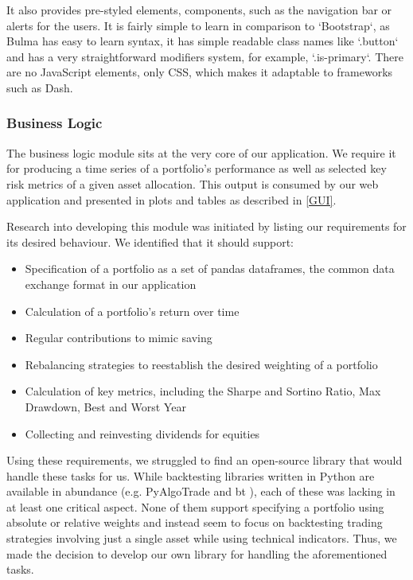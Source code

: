 \documentclass[main.tex]{subfiles}
\begin{document}
It also provides pre-styled elements, components, such as the navigation bar or alerts for the users. It is fairly simple to learn in comparison to `Bootstrap`, as Bulma has easy to learn syntax, it has simple readable class names like `.button` and has a very straightforward modifiers system, for example,  `.is-primary`. There are no JavaScript elements, only CSS, which makes it adaptable to frameworks such as Dash.


\subsubsection{Business Logic}
\label{BL}

The business logic module sits at the very core of our application. We require it for producing a time series of a portfolio's performance as well as selected key risk metrics of a given asset allocation. This output is consumed by our web application and presented in plots and tables as described in \ref{GUI}.

Research into developing this module was initiated by listing our requirements for its desired behaviour. We identified that it should support:

\begin{itemize}
    \item Specification of a portfolio as a set of pandas dataframes, the common data exchange format in our application
    \item Calculation of a portfolio's return over time
    \item Regular contributions to mimic saving
    \item Rebalancing strategies to reestablish the desired weighting of a portfolio
    \item Calculation of key metrics, including the Sharpe and Sortino Ratio, Max Drawdown, Best and Worst Year
    \item Collecting and reinvesting dividends for equities
\end{itemize}

Using these requirements, we struggled to find an open-source library that would handle these tasks for us. While backtesting libraries written in Python are available in abundance (e.g. PyAlgoTrade \cite{PyAlgoTrade} and bt \cite{bt}), each of these was lacking in at least one critical aspect. None of them support specifying a portfolio using absolute or relative weights and instead seem to focus on backtesting trading strategies involving just a single asset while using technical indicators. Thus, we made the decision to develop our own library for handling the aforementioned tasks.
\end{document}
